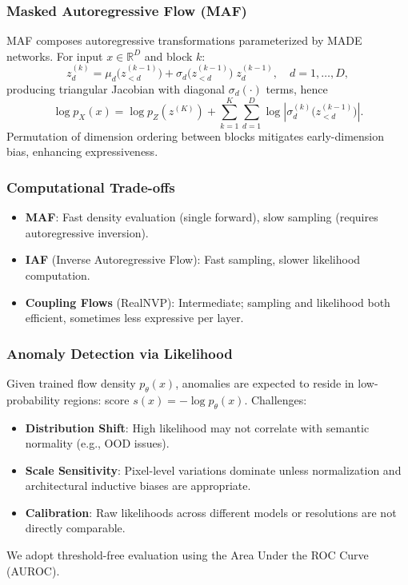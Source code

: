 \documentclass[conference]{IEEEtran}
\begin{document}
\subsubsection{Masked Autoregressive Flow (MAF)}
MAF composes autoregressive transformations parameterized by MADE networks. For input $x \in \mathbb{R}^D$ and block $k$:
\begin{equation}
 z^{(k)}_d = \mu_d\big(z^{(k-1)}_{<d}\big) + \sigma_d\big(z^{(k-1)}_{<d}\big) \; z^{(k-1)}_d, \quad d=1,\dots,D,
\end{equation}
producing triangular Jacobian with diagonal $\sigma_d(\cdot)$ terms, hence
\begin{equation}
 \log p_X(x) = \log p_Z(z^{(K)}) + \sum_{k=1}^{K} \sum_{d=1}^{D} \log \left| \sigma^{(k)}_d\big(z^{(k-1)}_{<d}\big) \right|.
\end{equation}
Permutation of dimension ordering between blocks mitigates early-dimension bias, enhancing expressiveness.

\subsubsection{Computational Trade-offs}
\begin{itemize}
 \item \textbf{MAF}: Fast density evaluation (single forward), slow sampling (requires autoregressive inversion).
 \item \textbf{IAF} (Inverse Autoregressive Flow): Fast sampling, slower likelihood computation.
 \item \textbf{Coupling Flows} (RealNVP): Intermediate; sampling and likelihood both efficient, sometimes less expressive per layer.
\end{itemize}

\subsubsection{Anomaly Detection via Likelihood}
Given trained flow density $p_{\theta}(x)$, anomalies are expected to reside in low-probability regions: score $s(x) = -\log p_{\theta}(x)$. Challenges:
\begin{itemize}
 \item \textbf{Distribution Shift}: High likelihood may not correlate with semantic normality (e.g., OOD issues).
 \item \textbf{Scale Sensitivity}: Pixel-level variations dominate unless normalization and architectural inductive biases are appropriate.
 \item \textbf{Calibration}: Raw likelihoods across different models or resolutions are not directly comparable.
\end{itemize}
We adopt threshold-free evaluation using the Area Under the ROC Curve (AUROC).
\end{document}
